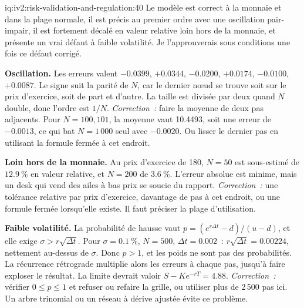 \begin{solution}{iq:iv2:risk-validation-and-regulation:40}
Le modèle est correct à la monnaie et dans la plage normale, il est précis au premier ordre avec une oscillation pair-impair, il est fortement décalé en valeur relative loin hors de la monnaie, et présente un vrai défaut à faible volatilité. Je l'approuverais sous conditions une fois ce défaut corrigé.

\textbf{Oscillation.} Les erreurs valent $-0.0399$, $+0.0344$, $-0.0200$, $+0.0174$, $-0.0100$, $+0.0087$. Le signe suit la parité de $N$, car le dernier nœud se trouve soit sur le prix d'exercice, soit de part et d'autre. La taille est divisée par deux quand $N$ double, donc l'ordre est $1/N$. \emph{Correction~:} faire la moyenne de deux pas adjacents. Pour $N = 100, 101$, la moyenne vaut 10.4493, soit une erreur de $-0.0013$, ce qui bat $N = 1\,000$ seul avec $-0.0020$. Ou lisser le dernier pas en utilisant la formule fermée à cet endroit.

\textbf{Loin hors de la monnaie.} Au prix d'exercice de 180, $N = 50$ est sous-estimé de $12.9~\%$ en valeur relative, et $N = 200$ de $3.6~\%$. L'erreur absolue est minime, mais un desk qui vend des ailes à bas prix se soucie du rapport. \emph{Correction~:} une tolérance relative par prix d'exercice, davantage de pas à cet endroit, ou une formule fermée lorsqu'elle existe. Il faut préciser la plage d'utilisation.

\textbf{Faible volatilité.} La probabilité de hausse vaut $p = (e^{r\Delta t} - d)/(u - d)$, et elle exige $\sigma > r\sqrt{\Delta t}$. Pour $\sigma = 0.1~\%$, $N = 500$, $\Delta t = 0.002$~: $r\sqrt{\Delta t} = 0.00224$, nettement au-dessus de $\sigma$. Donc $p > 1$, et les poids ne sont pas des probabilités. La récurrence rétrograde multiplie alors les erreurs à chaque pas, jusqu'à faire exploser le résultat. La limite devrait valoir $S - Ke^{-rT} = 4.88$. \emph{Correction~:} vérifier $0 \le p \le 1$ et refuser ou refaire la grille, ou utiliser plus de 2\,500 pas ici. Un arbre trinomial ou un réseau à dérive ajustée évite ce problème.


\end{solution}
